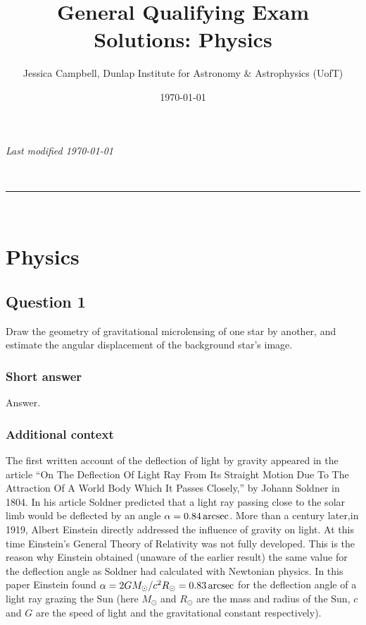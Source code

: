 \documentclass[a4paper,10pt]{article}
\makeatletter
\newcommand{\linia}{\rule{\linewidth}{0.5pt}}
\renewcommand{\maketitle}{
\begin{center}
\vspace{2ex}
{\huge \textsc{\@title}}
\vspace{1ex}
\\
\linia\\
\@author
\vspace{4ex}
\end{center}
}
\makeatother
\begin{document}
\hfill{\textit{Last modified \today}}
\title{General Qualifying Exam Solutions: Physics}
\author{Jessica Campbell, Dunlap Institute for Astronomy \& Astrophysics (UofT)}
\date{\today}
\maketitle

\tableofcontents



%
%
%
%

\newpage
\section{Physics}


\subsection{Question 1}

Draw the geometry of gravitational microlensing of one star by another, and estimate the angular displacement of the background star's image.

\subsubsection{Short answer}

Answer.

\subsubsection{Additional context}

The first written account of the deflection of light by gravity appeared in the article ``On The Deflection Of Light Ray From Its Straight Motion Due To The Attraction Of A World Body Which It Passes Closely,'' by Johann Soldner in 1804. In his article Soldner predicted that a light ray passing close to the solar limb would be deflected by an angle  $\alpha=0.84\,{\rm arcsec}$. More than a century later,in 1919, Albert Einstein directly addressed
the influence of gravity on light. At this time Einstein's General Theory of Relativity was not fully developed. This is the reason why Einstein obtained (unaware of the earlier result) the same value for the deflection angle as Soldner had calculated with Newtonian physics. In this paper Einstein found $\alpha=2GM_\odot/c^2R_\odot=0.83\,{\rm arcsec}$ for the deflection angle of a light ray grazing the Sun (here $M_\odot$ and $R_\odot$ are the mass and radius of the Sun, $c$ and $G$ are the speed of light and the gravitational constant respectively). 
\end{document}
